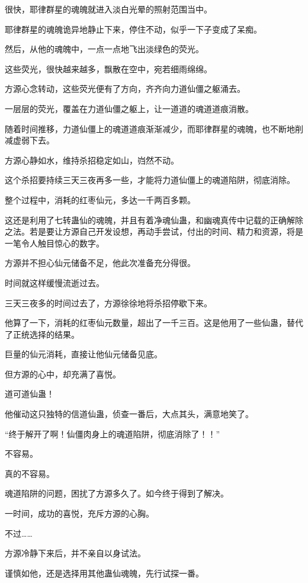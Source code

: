 
\begin{this_body}

很快，耶律群星的魂魄就进入淡白光晕的照射范围当中。

耶律群星的魂魄诡异地静止下来，停住不动，似乎一下子变成了呆痴。

然后，从他的魂魄中，一点一点地飞出淡绿色的荧光。

这些荧光，很快越来越多，飘散在空中，宛若细雨绵绵。

方源心念转动，这些荧光便有了方向，齐齐向力道仙僵之躯涌去。

一层层的荧光，覆盖在力道仙僵之躯上，让一道道的魂道道痕消散。

随着时间推移，力道仙僵上的魂道道痕渐渐减少，而耶律群星的魂魄，也不断地削减虚弱下去。

方源心静如水，维持杀招稳定如山，岿然不动。

这个杀招要持续三天三夜再多一些，才能将力道仙僵上的魂道陷阱，彻底消除。

整个过程中，消耗的红枣仙元，多达一千两百多颗。

这还是利用了七转蛊仙的魂魄，并且有着净魂仙蛊，和幽魂真传中记载的正确解除之法。若是要让方源自己开发设想，再动手尝试，付出的时间、精力和资源，将是一笔令人触目惊心的数字。

方源并不担心仙元储备不足，他此次准备充分得很。

时间就这样缓慢流逝过去。

三天三夜多的时间过去了，方源徐徐地将杀招停歇下来。

他算了一下，消耗的红枣仙元数量，超出了一千三百。这是他用了一些仙蛊，替代了正统选择的结果。

巨量的仙元消耗，直接让他仙元储备见底。

但方源的心中，却充满了喜悦。

道可道仙蛊！

他催动这只独特的信道仙蛊，侦查一番后，大点其头，满意地笑了。

“终于解开了啊！仙僵肉身上的魂道陷阱，彻底消除了！！”

不容易。

真的不容易。

魂道陷阱的问题，困扰了方源多久了。如今终于得到了解决。

一时间，成功的喜悦，充斥方源的心胸。

不过……

方源冷静下来后，并不亲自以身试法。

谨慎如他，还是选择用其他蛊仙魂魄，先行试探一番。


\end{this_body}
